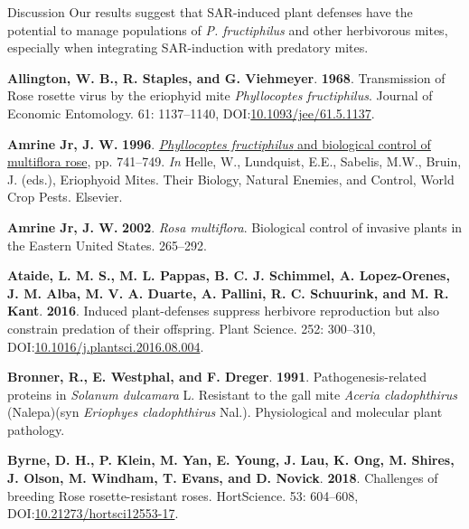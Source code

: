 \documentclass[
  ignorenonframetext,
]{beamer}
\newlength{\cslhangindent}
\newlength{\cslentryspacingunit} %
\newenvironment{CSLReferences}[2] %
 {%
  \setlength{\parindent}{0pt}
  \ifodd #1
  \let\oldpar\par
  \def\par{\hangindent=\cslhangindent\oldpar}
  \fi
  \setlength{\parskip}{#2\cslentryspacingunit}
 }%
 {}
\begin{document}
\begin{frame}{Discussion}
\protect\hypertarget{dis-asm-ipm}{}
Our results suggest that SAR-induced plant defenses have the potential
to manage populations of \emph{P. fructiphilus} and other herbivorous
mites, especially when integrating SAR-induction with predatory mites.

\hypertarget{refs}{}
\begin{CSLReferences}{1}{0}
\leavevmode{}%
\textbf{Allington, W. B., R. Staples, and G. Viehmeyer}. \textbf{1968}.
Transmission of {Rose rosette virus} by the eriophyid mite
{\emph{Phyllocoptes fructiphilus}}. Journal of Economic Entomology. 61:
1137--1140,
DOI:\href{https://doi.org/10.1093/jee/61.5.1137}{10.1093/jee/61.5.1137}.

\leavevmode{}%
\textbf{Amrine Jr, J. W.} \textbf{1996}.
\href{https://doi.org/10.1016/s1572-4379(96)80050-9}{{\emph{Phyllocoptes
fructiphilus}} and biological control of multiflora rose}, pp. 741--749.
\emph{In} Helle, W., Lundquist, E.E., Sabelis, M.W., Bruin, J. (eds.),
Eriophyoid Mites. Their Biology, Natural Enemies, and Control, World
Crop Pests. Elsevier.

\leavevmode{}%
\textbf{Amrine Jr, J. W.} \textbf{2002}. {\emph{Rosa multiflora}}.
Biological control of invasive plants in the Eastern {United States}.
265--292.

\leavevmode{}%
\textbf{Ataide, L. M. S., M. L. Pappas, B. C. J. Schimmel, A.
Lopez-Orenes, J. M. Alba, M. V. A. Duarte, A. Pallini, R. C. Schuurink,
and M. R. Kant}. \textbf{2016}. Induced plant-defenses suppress
herbivore reproduction but also constrain predation of their offspring.
Plant Science. 252: 300--310,
DOI:\href{https://doi.org/10.1016/j.plantsci.2016.08.004}{10.1016/j.plantsci.2016.08.004}.

\leavevmode{}%
\textbf{Bronner, R., E. Westphal, and F. Dreger}. \textbf{1991}.
Pathogenesis-related proteins in {\emph{Solanum dulcamara}} {L.}
Resistant to the gall mite {\emph{Aceria cladophthirus}} ({Nalepa})(syn
{\emph{Eriophyes cladophthirus}} {Nal.}). Physiological and molecular
plant pathology.

\leavevmode{}%
\textbf{Byrne, D. H., P. Klein, M. Yan, E. Young, J. Lau, K. Ong, M.
Shires, J. Olson, M. Windham, T. Evans, and D. Novick}. \textbf{2018}.
Challenges of breeding {Rose rosette}-resistant roses. {HortScience}.
53: 604--608,
DOI:\href{https://doi.org/10.21273/hortsci12553-17}{10.21273/hortsci12553-17}.


\end{CSLReferences}
\end{frame}
\end{document}
